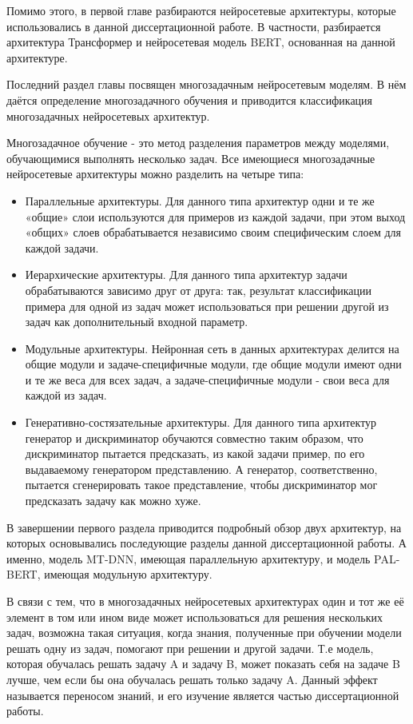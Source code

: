 Помимо этого, в первой главе разбираются нейросетевые архитектуры, которые использовались в данной диссертационной работе. В частности, разбирается архитектура Трансформер и нейросетевая модель {BERT}, основанная на данной архитектуре.

Последний раздел главы посвящен многозадачным нейросетевым моделям. В нём даётся определение многозадачного обучения и приводится классификация многозадачных нейросетевых архитектур.

Многозадачное обучение - это метод разделения параметров между моделями, обучающимися выполнять несколько задач. Все имеющиеся многозадачные нейросетевые архитектуры можно разделить на четыре типа:
\begin{itemize}
\item Параллельные архитектуры. Для данного типа архитектур одни и те же «общие» слои используются для примеров из каждой задачи, при этом выход «общих» слоев обрабатывается независимо своим специфическим слоем для каждой задачи. 
\item Иерархические архитектуры. Для данного типа архитектур задачи обрабатываются зависимо друг от друга: так, результат классификации примера для одной из задач может использоваться при решении другой из задач как дополнительный входной параметр.
\item Модульные архитектуры. Нейронная сеть в данных архитектурах делится на общие модули и задаче-специфичные модули, где общие модули имеют одни и те же веса для всех задач, а задаче-специфичные модули - свои веса для каждой из задач.
\item Генеративно-состязательные архитектуры. Для данного типа архитектур генератор и дискриминатор обучаются совместно таким образом, что дискриминатор пытается предсказать, из какой задачи пример, по его выдаваемому генератором представлению. А генератор, соответственно, пытается сгенерировать такое представление, чтобы дискриминатор мог предсказать задачу как можно хуже. 
\end{itemize}
В завершении первого раздела приводится подробный обзор двух архитектур, на которых основывались последующие разделы данной диссертационной работы. А именно, модель {MT-DNN}, имеющая параллельную архитектуру, и модель {PAL-BERT}, имеющая модульную архитектуру. 

В связи с тем, что в многозадачных нейросетевых архитектурах один и тот же её элемент в том или ином виде может использоваться для решения нескольких задач, возможна такая ситуация, когда знания, полученные при обучении модели решать одну из задач, помогают при решении и другой задачи. Т.е модель, которая обучалась решать задачу A и задачу B, может показать себя на задаче B лучше, чем если бы она обучалась решать только задачу A. Данный эффект называется переносом знаний, и его изучение является частью диссертационной работы.

